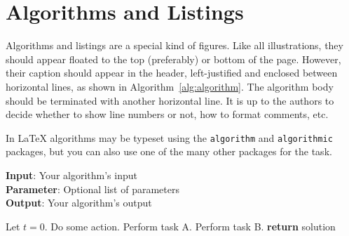 \documentclass{article}
\begin{document}
\section{Algorithms and Listings}

Algorithms and listings are a special kind of figures. Like all illustrations, they should appear floated to the top (preferably) or bottom of the page. However, their caption should appear in the header, left-justified and enclosed between horizontal lines, as shown in Algorithm~\ref{alg:algorithm}. The algorithm body should be terminated with another horizontal line. It is up to the authors to decide whether to show line numbers or not, how to format comments, etc.

In \LaTeX{} algorithms may be typeset using the {\tt algorithm} and {\tt algorithmic} packages, but you can also use one of the many other packages for the task.

\begin{algorithm}[tb]
\caption{Example algorithm}
\label{alg:algorithm}
\textbf{Input}: Your algorithm's input\\
\textbf{Parameter}: Optional list of parameters\\
\textbf{Output}: Your algorithm's output
\begin{algorithmic}[1] %
\STATE Let $t=0$.
\STATE Do some action.
\STATE Perform task A.
\ELSE
\STATE Perform task B.
\ENDIF
\ENDWHILE
\STATE \textbf{return} solution
\end{algorithmic}
\end{algorithm}





%

%

\end{document}
